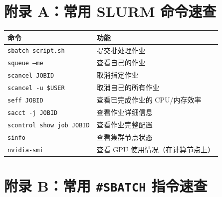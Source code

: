 \section{附录 A：常用 SLURM 命令速查}

\begin{table}[h]
\centering
\begin{tabular}{ll}
\toprule
命令 & 功能 \\
\midrule
\texttt{sbatch script.sh} & 提交批处理作业 \\
\texttt{squeue --me} & 查看自己的作业 \\
\texttt{scancel JOBID} & 取消指定作业 \\
\texttt{scancel -u \$USER} & 取消自己的所有作业 \\
\texttt{seff JOBID} & 查看已完成作业的 CPU/内存效率 \\
\texttt{sacct -j JOBID} & 查看作业详细信息 \\
\texttt{scontrol show job JOBID} & 查看作业完整配置 \\
\texttt{sinfo} & 查看集群节点状态 \\
\texttt{nvidia-smi} & 查看 GPU 使用情况（在计算节点上） \\
\bottomrule
\end{tabular}
\end{table}
\section{附录 B：常用 \texttt{\#SBATCH} 指令速查}

